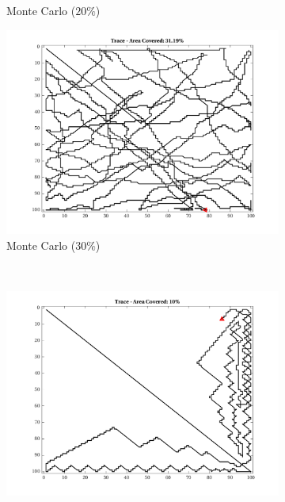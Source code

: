 \begin{figure}[htb!]
\begin{subfigure}[t]{0.32\textwidth}
        \captionsetup{skip=0.20\baselineskip,size=footnotesize}
        \caption{Monte Carlo ($20\%$)}
    \end{subfigure}%
    \begin{subfigure}[t]{0.32\textwidth}
        \centering
        \includegraphics[width=\linewidth]{figures/hbresults/path_mc_30p_100x100_sf_50_seed_2.png}
        \ssp
        \captionsetup{skip=0.20\baselineskip,size=footnotesize}
        \caption{Monte Carlo ($30\%$)}
    \end{subfigure}%
    \\
    \begin{subfigure}[t]{0.32\textwidth}
        \centering
        \includegraphics[width=\linewidth]{figures/hbresults/path_gradient_10p_100x100_sf_50_seed_2.png}

\end{subfigure}
\end{figure}
